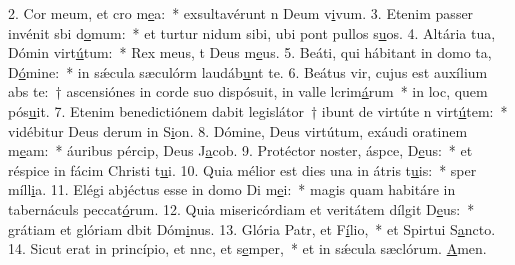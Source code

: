 2. Cor meum, et cro m\uline{e}a:~* exsultavérunt n Deum v\uline{i}vum.
3. Etenim passer invénit sbi d\uline{o}mum:~* et turtur nidum sibi, ubi pont pullos s\uline{u}os.
4. Altária tua, Dómin virt\uline{ú}tum:~* Rex meus, t Deus m\uline{e}us.
5. Beáti, qui hábitant in domo ta, D\uline{ó}mine:~* in sǽcula sæculórm laudáb\uline{u}nt te.
6. Beátus vir, cujus est auxílium abs te:~† ascensiónes in corde suo dispósuit, in valle lcrim\uline{á}rum~* in loc, quem pós\uline{u}it.
7. Etenim benedictiónem dabit legislátor~† ibunt de virtúte n virt\uline{ú}tem:~* vidébitur Deus derum in S\uline{i}on.
8. Dómine, Deus virtútum, exáudi oratinem m\uline{e}am:~* áuribus pércip, Deus J\uline{a}cob.
9. Protéctor noster, áspce, D\uline{e}us:~* et réspice in fácim Christi t\uline{u}i.
10. Quia mélior est dies una in átris t\uline{u}is:~* sper míll\uline{i}a.
11. Elégi abjéctus esse in domo Di m\uline{e}i:~* magis quam habitáre in tabernáculs peccat\uline{ó}rum.
12. Quia misericórdiam et veritátem dílgit D\uline{e}us:~* grátiam et glóriam dbit Dóm\uline{i}nus.
13. Glória Patr, et F\uline{í}lio,~* et Spirtui S\uline{a}ncto.
14. Sicut erat in princípio, et nnc, et s\uline{e}mper,~* et in sǽcula sæclórum. \uline{A}men.
